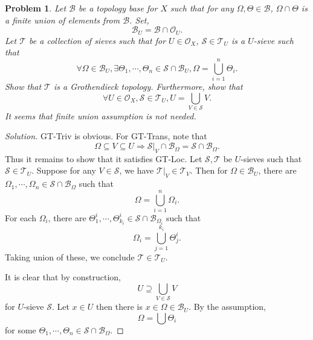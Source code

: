 \documentclass[8pt]{article}
\numberwithin{equation}{section}
\newenvironment{solution}{\begin{proof}[Solution]}{\end{proof}}
\newtheorem{problem}{Problem}[section]
\newcommand{\Ouv}{\mathscr{O}}
\newcommand{\sS}[0]{\mathscr{S}}
\newcommand{\cB}[0]{\mathcal{B}}
\newcommand{\cT}[0]{\mathcal{T}}
\newcommand{\sT}[0]{\mathscr{T}}
\begin{document}
\begin{problem}
Let $\cB$ be a topology base for $X$ such that for any $\Omega,\Theta\in\cB$, $\Omega\cap\Theta$ is a finite union of elements from $\cB$. Set,
\begin{equation*}
  \cB_U = \cB\cap\Ouv_U.
\end{equation*}
Let $\mathcal{T}$ be a collection of sieves such that for $U\in\Ouv_X$, $\sS\in\mathcal{T}_U$ is a $U$-sieve such that 
\begin{equation*}
  \forall \Omega\in\cB_U,\exists \Theta_1,\cdots,\Theta_n\in\sS\cap\cB_U, \Omega=\bigcup_{i=1}^n\Theta_i.
\end{equation*}
Show that $\cT$ is a Grothendieck topology. Furthermore, show that 
\begin{equation*}
  \forall U\in\Ouv_X, \sS\in\cT_U, U = \bigcup_{V\in\sS}V.
\end{equation*}
It seems that finite union assumption is not needed.
\end{problem}
\begin{solution}
  GT-Triv is obvious. For GT-Trans, note that 
  \begin{equation*}
    \Omega\subseteq V\subseteq U\Rightarrow \sS|_V\cap \cB_\Omega = \sS\cap \cB_\Omega.
  \end{equation*}
  Thus it remains to show that it satisfies GT-Loc. Let $\sS,\sT$ be $U$-sieves such that $\sS\in\cT_U$. Suppose for any $V\in\sS$, we have $\sT|_V\in\cT_V$. 
  Then for $\Omega\in \cB_U$, there are $\Omega_1,\cdots,\Omega_n\in\sS\cap\cB_\Omega$ such that 
  \begin{equation*}
    \Omega = \bigcup_{i=1}^n \Omega_i.
  \end{equation*}
  For each $\Omega_i$, there are $\Theta^i_1,\cdots,\Theta^i_{k_i}\in\sS\cap\cB_{\Omega_i}$ such that 
  \begin{equation*}
    \Omega_i = \bigcup_{j=1}^{k_i} \Theta^i_j.
  \end{equation*}
  Taking union of these, we conclude $\sT\in\cT_U$.
  \par It is clear that by construction,
  \begin{equation*}
    U\supseteq\bigcup_{V\in\sS}V
  \end{equation*}
  for $U$-sieve $\sS$. Let $x\in U$ then there is $x\in\Omega\in\cB_U$. By the assumption,
  \begin{equation*}
    \Omega = \bigcup\Theta_i
  \end{equation*}
  for some $\Theta_1,\cdots,\Theta_n\in \sS\cap\cB_\Omega$.
\end{solution}
\end{document}
